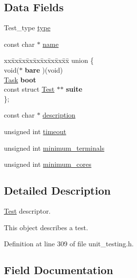 \subsection*{Data Fields}
\begin{DoxyCompactItemize}
\item 
Test\+\_\+type \hyperlink{structTest_a5074007b777ea0958966027197c17792}{type}
\item 
const char $\ast$ \hyperlink{structTest_ae44674e48b203d9c26e04e09b6fe5b61}{name}
\item 
\begin{tabbing}
xx\=xx\=xx\=xx\=xx\=xx\=xx\=xx\=xx\=\kill
union \{\\
\>void($\ast$ {\bfseries bare} )(void)\\
\>\hyperlink{group__syscalls_gaec3f2f835e105271fbbc00272c0ba984}{Task} {\bfseries boot}\\
\>const struct \hyperlink{structTest}{Test} $\ast$$\ast$ {\bfseries suite}\\
\}; \\

\end{tabbing}\item 
const char $\ast$ \hyperlink{structTest_a294ca3f1114240c908f66216afcad783}{description}
\item 
unsigned int \hyperlink{structTest_a80e78f2e6aeed2a6e5b7c705ce5a1493}{timeout}
\item 
unsigned int \hyperlink{structTest_a2741188633c51b8e3cb545fa3971bf60}{minimum\+\_\+terminals}
\item 
unsigned int \hyperlink{structTest_ac203918837b4c6718a020246e189a95a}{minimum\+\_\+cores}
\end{DoxyCompactItemize}


\subsection{Detailed Description}
\hyperlink{structTest}{Test} descriptor. 

This object describes a test. 

Definition at line 309 of file unit\+\_\+testing.\+h.



\subsection{Field Documentation}
\mbox{\label{structTest_a6dd50dae1a4469e7723e85331dbf9ba0}} 
